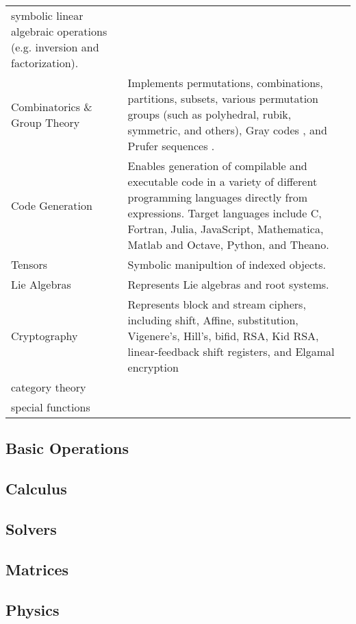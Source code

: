 \begin{table}
\begin{tabular}[htbc]{|l|l|}
    symbolic linear algebraic operations (e.g. inversion and factorization).\\
Combinatorics \& Group Theory & Implements permutations, combinations,
    partitions, subsets,
    various permutation groups (such as polyhedral, rubik, symmetric,
    and others), Gray codes \cite{Nijenhuis1978combinatorial},
    and Prufer sequences \cite{biggs1976graph}.\\
Code Generation & Enables generation of compilable and executable
    code in a variety of different programming languages directly from
    expressions. Target languages include C, Fortran, Julia, JavaScript,
    Mathematica, Matlab and Octave, Python, and Theano.\\
Tensors & Symbolic manipultion of indexed objects.\\
Lie Algebras & Represents Lie algebras and root systems.\\
Cryptography & Represents block and stream ciphers, including
    shift, Affine, substitution, Vigenere's, Hill's, bifid, RSA, Kid RSA,
    linear-feedback shift registers, and Elgamal encryption\\
category theory & \\
special functions & \\
\hline
\end{tabular}
\end{table}


\subsection{Basic Operations}

\subsection{Calculus}

\subsection{Solvers}

\subsection{Matrices}

\subsection{Physics}

